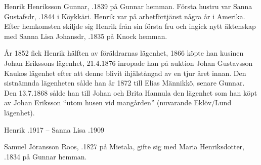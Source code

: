 Henrik Henriksson Gunnar, .1839 på Gunnar hemman. Första hustru var Sanna Gustafsdr, .1844 i Köykkäri. Henrik var på arbetförtjänst några år i Amerika. Efter hemkomsten skiljde sig Henrik från sin första fru och ingick nytt äktenskap med Sanna Lisa Johansdr, .1835 på Knock hemman.
\begin{jhchildren}
  \item {}
  \item {}
  \item {}
  \item {}
  \item {}
\end{jhchildren}
År 1852 fick Henrik hälften av föräldrarnas lägenhet, 1866 köpte han kusinen Johan Erikssons lägenhet, 21.4.1876 inropade han på auktion Johan Gustavsson Kaukos lägenhet efter att denne blivit ihjälstångad av en tjur året innan. Den sistnämnda lägenheten sålde han år 1872 till Elias Männikkö, senare Gunnar. Den 13.7.1868 sålde han till Johan och Brita Hannula den lägenhet som han köpt av Johan Eriksson ``utom	husen vid mangården'' (nuvarande Eklöv/Lund lägenhet).

Henrik .1917  --  Sanna Lisa .1909


Samuel Jöransson Roos, .1827 på Mietala, gifte sig med Maria Henriksdotter, .1834 på Gunnar hemman.

